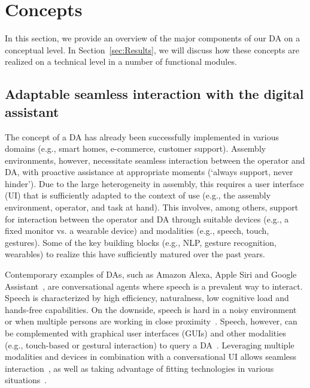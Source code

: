 \section{Concepts}\label{sec:Concepts}
In this section, we provide an overview of the major components of our DA on a conceptual level. In Section~\ref{sec:Results}, we will discuss how these concepts are realized on a technical level in a number of functional modules.

\subsection{Adaptable seamless interaction with the digital assistant}\label{sec:DA}
The concept of a DA has already been successfully implemented in various domains (e.g., smart homes, e-commerce, customer support). Assembly environments, however, necessitate seamless interaction between the operator and DA, with proactive assistance at appropriate moments (`always support, never hinder'). Due to the large heterogeneity in assembly, this requires a user interface (UI) that is sufficiently adapted to the context of use (e.g., the assembly environment, operator, and task at hand). This involves, among others, support for interaction between the operator and DA through suitable devices (e.g., a fixed monitor vs. a wearable device) and modalities (e.g., speech, touch, gestures). Some of the key building blocks (e.g., NLP, gesture recognition, wearables) to realize this have sufficiently matured over the past years.

Contemporary examples of DAs, such as Amazon Alexa, Apple Siri and Google Assistant~\cite{de2020intelligent}, are conversational agents where speech is a prevalent way to interact. Speech is characterized by high efficiency, naturalness, low cognitive load and hands-free capabilities. On the downside, speech is hard in a noisy environment or when multiple persons are working in close proximity~\cite{hou2018VisualFeedbackDesign}. Speech, however, can be complemented with graphical user interfaces (GUIs) and other modalities (e.g., touch-based or gestural interaction) to query a DA~\cite{belkadi2020IntelligentAssistantSystem,klopfenstein2017RiseBotsSurvey,heller2019TaskHerderWearableMinimal}. Leveraging multiple modalities and devices in combination with a conversational UI allows seamless interaction~\cite{white2019MultideviceDigitalAssistance}, as well as taking advantage of fitting technologies in various situations~\cite{heinz2018MultideviceAssistiveSystem}. 

